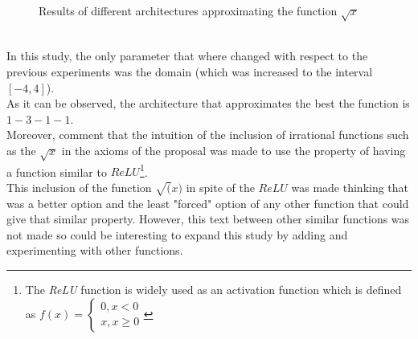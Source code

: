 \documentclass[a4paper, 11pt]{article}
\begin{document}
\begin{figure}[h]
    \hspace{1em}
    \caption{Results of different architectures approximating the function $\sqrt{x}$}
    \label{sqrt100}
\end{figure}\\
In this study, the only parameter that where changed with respect to the previous experiments was the domain (which was increased to the interval $[-4,4]$).\\
As it can be observed, the architecture that approximates the best the function is $1-3-1-1$.\\
Moreover, comment that the intuition of the inclusion of irrational functions such as the $\sqrt{x}$ in the axioms of the proposal was made to use the property of having a function similar to $ReLU$\footnote{The \textit{ReLU} function is widely used as an activation function which is defined as $f(x) = \left\{ \begin{matrix} 0, x < 0 \\ x, x\geq 0\end{matrix} \right.$}.\\
This inclusion of the function $\sqrt(x)$ in spite of the $ReLU$ was made thinking that was a better option and the least "forced" option of any other function that could give that similar property. However, this text between other similar functions was not made so could be interesting to expand this study by adding and experimenting with other functions.
\end{document}
